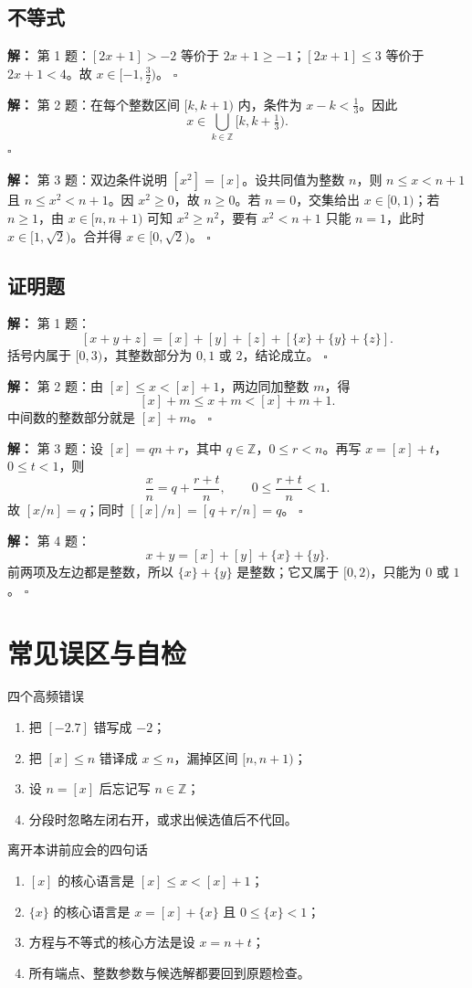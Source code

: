 \documentclass[11pt,a4paper,fontset=fandol]{ctexart}
\theoremstyle{formaltheorem}
\theoremstyle{formalexample}
\newenvironment{solution}{\par\noindent\textbf{解：}}{\hfill$\square$\par}
\begin{document}
\subsection{不等式}
\begin{solution}
第 1 题：$[2x+1]>-2$ 等价于 $2x+1\ge-1$；$[2x+1]\le3$ 等价于 $2x+1<4$。故 $x\in[-1,\frac32)$。
\end{solution}
\begin{solution}
第 2 题：在每个整数区间 $[k,k+1)$ 内，条件为 $x-k<\frac13$。因此
\[
x\in\bigcup_{k\in\mathbb Z}[k,k+\tfrac13).
\]
\end{solution}
\begin{solution}
第 3 题：双边条件说明 $[x^2]=[x]$。设共同值为整数 $n$，则 $n\le x<n+1$ 且 $n\le x^2<n+1$。因 $x^2\ge0$，故 $n\ge0$。若 $n=0$，交集给出 $x\in[0,1)$；若 $n\ge1$，由 $x\in[n,n+1)$ 可知 $x^2\ge n^2$，要有 $x^2<n+1$ 只能 $n=1$，此时 $x\in[1,\sqrt2)$。合并得 $x\in[0,\sqrt2)$。
\end{solution}

\subsection{证明题}
\begin{solution}
第 1 题：
\[
[x+y+z]=[x]+[y]+[z]+[\{x\}+\{y\}+\{z\}].
\]
括号内属于 $[0,3)$，其整数部分为 $0,1$ 或 $2$，结论成立。
\end{solution}
\begin{solution}
第 2 题：由 $[x]\le x<[x]+1$，两边同加整数 $m$，得
\[
[x]+m\le x+m<[x]+m+1.
\]
中间数的整数部分就是 $[x]+m$。
\end{solution}
\begin{solution}
第 3 题：设 $[x]=qn+r$，其中 $q\in\mathbb Z$，$0\le r<n$。再写 $x=[x]+t$，$0\le t<1$，则
\[
\frac xn=q+\frac{r+t}{n},\qquad 0\le\frac{r+t}{n}<1.
\]
故 $[x/n]=q$；同时 $[[x]/n]=[q+r/n]=q$。
\end{solution}
\begin{solution}
第 4 题：
\[
x+y=[x]+[y]+\{x\}+\{y\}.
\]
前两项及左边都是整数，所以 $\{x\}+\{y\}$ 是整数；它又属于 $[0,2)$，只能为 $0$ 或 $1$。
\end{solution}

\section{常见误区与自检}
\begin{notebox}{四个高频错误}
\begin{enumerate}
  \item 把 $[-2.7]$ 错写成 $-2$；
  \item 把 $[x]\le n$ 错译成 $x\le n$，漏掉区间 $[n,n+1)$；
  \item 设 $n=[x]$ 后忘记写 $n\in\mathbb Z$；
  \item 分段时忽略左闭右开，或求出候选值后不代回。
\end{enumerate}
\end{notebox}

\begin{goalbox}{离开本讲前应会的四句话}
\begin{enumerate}
  \item $[x]$ 的核心语言是 $[x]\le x<[x]+1$；
  \item $\{x\}$ 的核心语言是 $x=[x]+\{x\}$ 且 $0\le\{x\}<1$；
  \item 方程与不等式的核心方法是设 $x=n+t$；
  \item 所有端点、整数参数与候选解都要回到原题检查。
\end{enumerate}
\end{goalbox}
\end{document}
